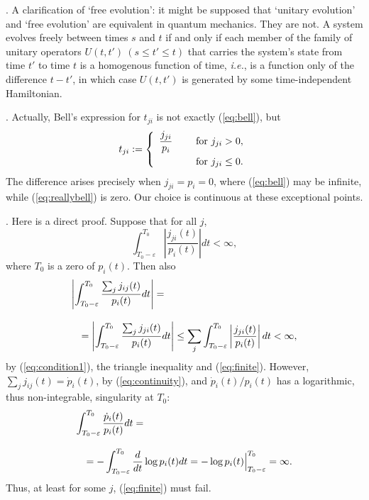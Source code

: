 \documentclass[12pt]{article}
\newcommand{\be}{\vspace*{6pt} \begin{equation}}
\newcommand{\ee}{\vspace*{10pt} \end{equation}}
\newcommand{\ie}{{\it i.e.}}         %
\renewcommand{\epsilon}{\varepsilon}
\newcommand{\abs}[1]{\left|#1\right|}
\begin{document}
\vspace*{12pt}

.  A clarification of `free evolution':  it might be 
supposed that `unitary evolution' and `free evolution' are equivalent 
in quantum mechanics.  They are not.  A system evolves freely between 
times $s$ and $t$ if and only if each member of the family of unitary 
operators $U(t,t')\ (s \leq t' \leq t)$ that carries the system's 
state from time $t'$ to time $t$ is a homogenous function of time,
\ie, is a function only of the difference $t-t'$, in which case
$U(t,t')$ is generated by some time-independent Hamiltonian.


\vspace*{12pt}

.  Actually, Bell's expression for $t_{ji}$ is not exactly
(\ref{eq:bell}), but
\be
  \label{eq:reallybell}
  t_{ji} := \left\{
  \begin{array}{ll}
    {\displaystyle \frac{j_{ji}}{p_i}} \ \ & \ \ \mbox{for} 
    \ j_{ji} > 0, \\[2ex]
     & \ \ \mbox{for} \ j_{ji} \leq 0.
  \end{array} \right.
\ee
The difference arises precisely when $j_{ji}=p_i=0$, where 
(\ref{eq:bell}) may be infinite, while (\ref{eq:reallybell}) is zero.  
Our choice is continuous at these exceptional points.

\vspace*{12pt}

. Here is a direct proof. Suppose that for all $j$,
  \begin{equation}
    \int_{T_0-\epsilon}^{T_0}\abs{\frac{j_{ji}(t)}{p_i(t)}}dt<\infty,
    \label{eq:finite}
  \end{equation}
where $T_0$ is a zero of $p_i(t)$. Then also
\begin{eqnarray}
  \lefteqn{{\displaystyle
  \abs{\int_{T_0-\epsilon}^{T_0}
  \frac{\sum_j j_{ij}(t)}{p_i(t)}dt}=}}
  \nonumber \\[2ex]   
  & & {\displaystyle
  =\abs{\int_{T_0-\epsilon}^{T_0}\frac{\sum_j j_{ji}(t)}{p_i(t)}dt} 
  \leq
  \sum_j\int_{T_0-\epsilon}^{T_0}\abs{\frac{j_{ji}(t)}{p_i(t)}}dt 
  <\infty, }
\end{eqnarray}
by (\ref{eq:condition1}), the triangle inequality and 
(\ref{eq:finite}).  However, $\sum_j j_{ij}(t)=\dot{p}_i(t)$, by 
(\ref{eq:continuity}), and $\dot{p}_i(t)/p_i(t)$ has a logarithmic, 
thus non-integrable, singularity at $T_0$:
\begin{eqnarray}
  \lefteqn{{\displaystyle
  \int_{T_0-\epsilon}^{T_0}\frac{\dot{p}_i(t)}{p_i(t)}dt=}}
  \nonumber \\[2ex]
  & & {\displaystyle
  =-\int_{T_0-\epsilon}^{T_0}\frac{d}{dt}\log p_i(t)dt=
  -\log p_i(t)\Big|_{T_0-\epsilon}^{T_0}=\infty. }
\end{eqnarray}
Thus, at least for some $j$, (\ref{eq:finite}) must fail.
\end{document}
